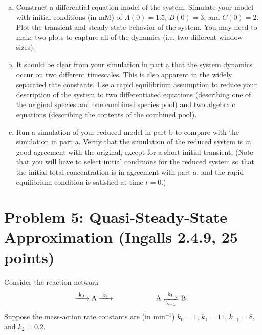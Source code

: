 \documentclass{article}
\begin{document}
\begin{enumerate}[a)]
\setlength{\itemsep}{0pt}
\item Construct a differential equation model of the system. Simulate your model with initial conditions (in mM) of $A(0)=1.5$, $B(0) = 3$, and $C(0)=2$. Plot the transient and steady-state behavior of the system. You may need to make two plots to capture all of the dynamics (i.e. two different window sizes).
\item It should be clear from your simulation in part a that the system dynamics occur on two different timescales. This is also apparent in the widely separated rate constants. Use a rapid equilibrium assumption to reduce your description of the system to two differentiated equations (describing one of the original species and one combined species pool) and two algebraic equations (describing the contents of the combined pool).
\item Run a simulation of your reduced model in part b to compare with the simulation in part a. Verify that the simulation of the reduced system is in good agreement with the original, except for a short initial transient. (Note that you will have to select initial conditions for the reduced system so that the initial total concentration is in agreement with part a, and the rapid equilibrium condition is satisfied at time $t=0$.)
\end{enumerate}

\section*{Problem 5: Quasi-Steady-State Approximation (Ingalls 2.4.9, 25 points)}
Consider the reaction network
\begin{eqnarray*}
&\ce{->[k_0]  \textrm{A} ->[k_2] } \hspace{2 cm} \ce{\textrm{A} <=>[k_1][k_{-1}] \textrm{B} }&
\end{eqnarray*}
Suppose the mass-action rate constants are (in min$^{-1}$) $k_0 = 1$, $k_1 = 11$, $k_{-1} = 8$, and $k_2 = 0.2$.
\end{document}
